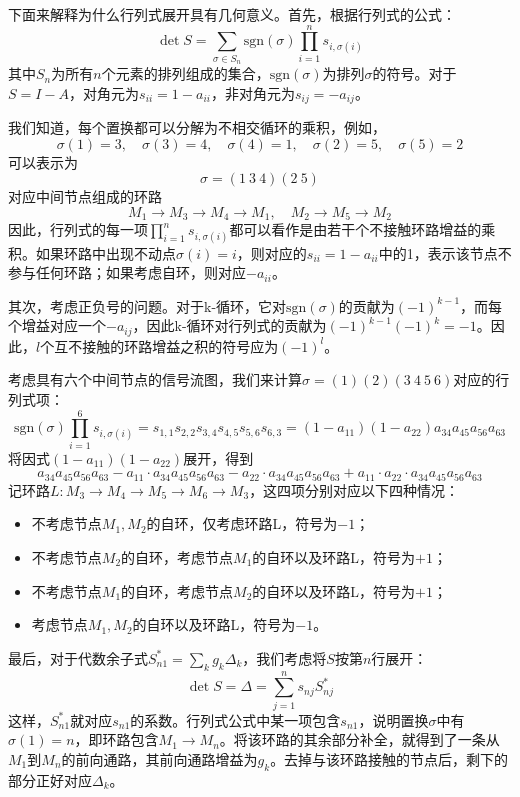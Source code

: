 下面来解释为什么行列式展开具有几何意义。首先，根据行列式的公式：
\[\det S=\sum_{\sigma\in S_n}\mathrm{sgn}(\sigma)\prod_{i=1}^{n}s_{i,\sigma(i)}\]
其中$S_n$为所有$n$个元素的排列组成的集合，$\mathrm{sgn}(\sigma)$为排列$\sigma$的符号。对于$S=I-A$，对角元为$s_{ii}=1-a_{ii}$，非对角元为$s_{ij}=-a_{ij}$。

我们知道，每个置换都可以分解为不相交循环的乘积，例如，$$\sigma(1)=3,\quad \sigma(3)=4,\quad \sigma(4)=1,\quad \sigma(2)=5,\quad \sigma(5)=2$$
可以表示为
$$\sigma=(1\ 3\ 4)(2\ 5)$$
对应中间节点组成的环路
$$M_1\to M_3\to M_4\to M_1,\quad M_2\to M_5\to M_2$$
因此，行列式的每一项$\prod_{i=1}^{n}s_{i,\sigma(i)}$都可以看作是由若干个不接触环路增益的乘积。如果环路中出现不动点$\sigma(i)=i$，则对应的$s_{ii}=1-a_{ii}$中的1，表示该节点不参与任何环路；如果考虑自环，则对应$-a_{ii}$。

其次，考虑正负号的问题。对于k-循环，它对$\mathrm{sgn}(\sigma)$的贡献为$(-1)^{k-1}$，而每个增益对应一个$-a_{ij}$，因此k-循环对行列式的贡献为$(-1)^{k-1}(-1)^k=-1$。因此，$l$个互不接触的环路增益之积的符号应为$(-1)^l$。
\begin{example}
    考虑具有六个中间节点的信号流图，我们来计算$\sigma=(1)(2)(3\ 4\ 5\ 6)$对应的行列式项：
    \[\mathrm{sgn}(\sigma)\prod_{i=1}^{6}s_{i,\sigma(i)}=s_{1,1}s_{2,2}s_{3,4}s_{4,5}s_{5,6}s_{6,3}=(1-a_{11})(1-a_{22})a_{34}a_{45}a_{56}a_{63}\]
    将因式$(1-a_{11})(1-a_{22})$展开，得到
    \[a_{34}a_{45}a_{56}a_{63}-a_{11}\cdot a_{34}a_{45}a_{56}a_{63}-a_{22}\cdot a_{34}a_{45}a_{56}a_{63}+a_{11}\cdot a_{22}\cdot a_{34}a_{45}a_{56}a_{63}\]
    记环路$L:M_3\to M_4\to M_5\to M_6\to M_3$，这四项分别对应以下四种情况：\begin{itemize}
        \item 不考虑节点$M_1,M_2$的自环，仅考虑环路L，符号为$-1$；
        \item 不考虑节点$M_2$的自环，考虑节点$M_1$的自环以及环路L，符号为$+1$；
        \item 不考虑节点$M_1$的自环，考虑节点$M_2$的自环以及环路L，符号为$+1$；
        \item 考虑节点$M_1,M_2$的自环以及环路L，符号为$-1$。
    \end{itemize}
\end{example}

最后，对于代数余子式$S^*_{n1}=\sum_{k}g_k\Delta_k$，我们考虑将$S$按第$n$行展开：
\[\det S=\Delta=\sum_{j=1}^{n}s_{nj}S^*_{nj}\]
这样，$S^*_{n1}$就对应$s_{n1}$的系数。行列式公式中某一项包含$s_{n1}$，说明置换$\sigma$中有$\sigma(1)=n$，即环路包含$M_1\to M_n$。将该环路的其余部分补全，就得到了一条从$M_1$到$M_n$的前向通路，其前向通路增益为$g_k$。去掉与该环路接触的节点后，剩下的部分正好对应$\Delta_k$。

